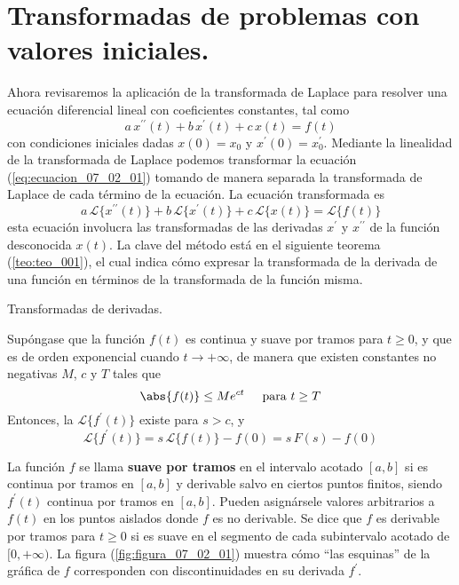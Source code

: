 \section{Transformadas de problemas con valores iniciales.}
Ahora revisaremos la aplicación de la transformada de Laplace para resolver una ecuación diferencial lineal con coeficientes constantes, tal como 
\begin{equation}
a \, x^{\prime \prime} (t) + b \, x^{\prime} (t) + c \, x(t) = f(t)
\label{eq:ecuacion_07_02_01}
\end{equation}
con condiciones iniciales dadas $x(0) = x_{0}$ y $x^{\prime}(0) = x^{\prime}_{0}$. Mediante la linealidad de la
transformada de Laplace podemos transformar la ecuación (\ref{eq:ecuacion_07_02_01}) tomando de manera separada la transformada de Laplace de cada término de la ecuación. La ecuación transformada es
\begin{equation}
a \, \mathscr{L} \{ x^{\prime \prime} (t) \} + b \, \mathscr{L} \{ x^{\prime} (t) \} + c \, \mathscr{L} \{ x (t) \} = \mathscr{L} \{ f(t) \}
\label{eq:ecuacion_07_02_02}
\end{equation}
esta ecuación involucra las transformadas de las derivadas $x^{\prime}$ y $x^{\prime \prime}$ de la función desconocida 
$x(t)$. La clave del método está en el siguiente teorema (\ref{teo:teo_001}), el cual indica cómo expresar la transformada de la derivada de una función en términos de la transformada de la función misma.
\begin{teo}{Transformadas de derivadas.}\label{teo:teo_001}

Supóngase que la función $f(t)$ es continua y suave por tramos para $t \geq 0$, y que es de orden exponencial cuando $t \to + \infty$, de manera que existen constantes no negativas $M$, $c$ y $T$ tales que
\begin{equation}
\abs{f(t)} \leq M e^{ct} \hspace{0.5cm} \mbox{para } t \geq T
\label{eq:ecuacion_07_02_03}
\end{equation}
Entonces, la $\mathscr{L} \{ f^{\prime} (t) \} $ existe para $s > c$, y
\begin{equation}
\mathscr{L} \{ f^{\prime} (t) \} = s \, \mathscr{L} \{ f(t) \} - f(0) = s \, F(s) - f(0)
\label{eq:ecuacion_07_02_04}
\end{equation}
\end{teo}
La función $f$ se llama \textbf{suave por tramos} en el intervalo acotado $[a, b]$ si es continua por tramos en $[a, b]$ y derivable salvo en ciertos puntos finitos, siendo $f^{\prime}(t)$ continua por tramos en $[a, b]$. Pueden asignársele valores arbitrarios a $f(t)$ en los puntos aislados donde $f$ es no derivable. Se dice que $f$ es derivable por tramos para $t \geq 0$ si es suave en el segmento de cada subintervalo acotado de $[0, +\infty)$. La figura (\ref{fig:figura_07_02_01}) muestra cómo \enquote{las esquinas} de la gráfica de $f$ corresponden con discontinuidades en su derivada $f^{\prime}$.
